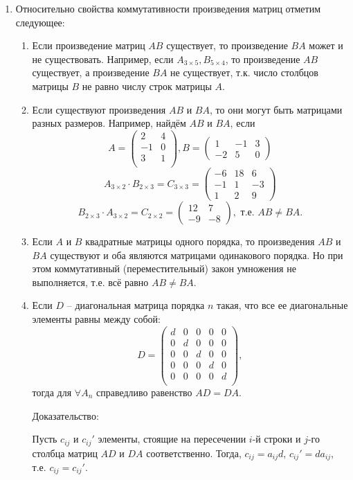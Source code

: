 \documentclass[a4paper,14pt]{article}
\begin{document}
\begin{enumerate}
	\item Относительно свойства коммутативности произведения матриц отметим следующее:
	\begin{enumerate}
		\item Если произведение матриц $AB$ существует, то произведение $BA$ может и не существовать. Например, если $A_{3 \times 5}, B_{5 \times 4}$, то произведение $AB$ существует, а произведение $BA$ не существует, т.к. число столбцов матрицы $B$ не равно числу строк матрицы $A$.
		\item Если существуют произведения $AB$ и $BA$, то они могут быть матрицами разных размеров. Например, найдём $AB$ и $BA$, если
		\[
		A=
		\begin{pmatrix}
		2 & 4 \\
		-1 & 0 \\
		3 & 1 \\
		\end{pmatrix}, 
		B=
		\begin{pmatrix}
		1 & -1 & 3 \\
		-2 & 5 & 0
		\end{pmatrix}
		\]
		\[
		A_{3 \times 2} \cdot B_{2 \times 3} = C_{3 \times 3} =
		\begin{pmatrix}
		-6 & 18 & 6 \\
		-1 & 1 & -3 \\
		1 & 2 & 9
		\end{pmatrix}
		\]
		\[
		B_{2 \times 3} \cdot A_{3 \times 2} = C_{2 \times 2} =
		\begin{pmatrix}
		12 & 7 \\
		-9 & -8
		\end{pmatrix}, \text{ т.е. } AB \ne BA.
		\]
		\item Если $A$ и $B$ квадратные матрицы одного порядка, то произведения $AB$ и $BA$ существуют и оба являются матрицами одинакового порядка. Но при этом коммутативный (переместительный) закон умножения не выполняется, т.е. всё равно $AB \ne BA$.
		\item Если $D$ – диагональная матрица порядка $n$ такая, что все ее диагональные элементы равны между собой:
		\[
		D=
		\begin{pmatrix}
		d & 0 & 0 & 0 & 0 \\
		0 & d & 0 & 0 & 0 \\
		0 & 0 & d & 0 & 0 \\
		0 & 0 & 0 & d & 0 \\
		0 & 0 & 0 & 0 & d \\
		\end{pmatrix},
		\]
		тогда для $\forall A_{n}$ справедливо равенство $AD=DA$.
		
		Доказательство:
		
		Пусть $c_{ij}$ и $c_{ij}'$ элементы, стоящие на пересечении $i$-й строки и $j$-го столбца матриц $AD$ и $DA$ соответственно. Тогда, $c_{ij}=a_{ij}d$, $c_{ij}'=da_{ij}$, т.е. $c_{ij}=c_{ij}'$.
	\end{enumerate}
\end{enumerate}
\end{document}
